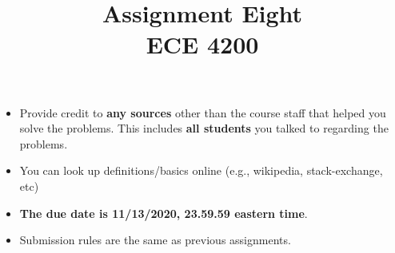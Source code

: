 \documentclass[11pt]{article}
\title{Assignment Eight\\ ECE 4200}
\date{}
\newenvironment{problem}[2][Problem]{\begin{trivlist}
\item[\hskip \labelsep {\bfseries #1}\hskip \labelsep {\bfseries #2.}]}{\end{trivlist}}
\begin{document}
\maketitle 

\begin{itemize}
\item
Provide credit to \textbf{any sources} other than the course staff that helped you solve the problems. This includes \textbf{all students} you talked to regarding the problems. 	
\item
You can look up definitions/basics online (e.g., wikipedia, stack-exchange, etc)
\item
{\bf The due date is 11/13/2020, 23.59.59 eastern time}. 
\item
Submission rules are the same as previous assignments.
\end{itemize}




\end{document}
